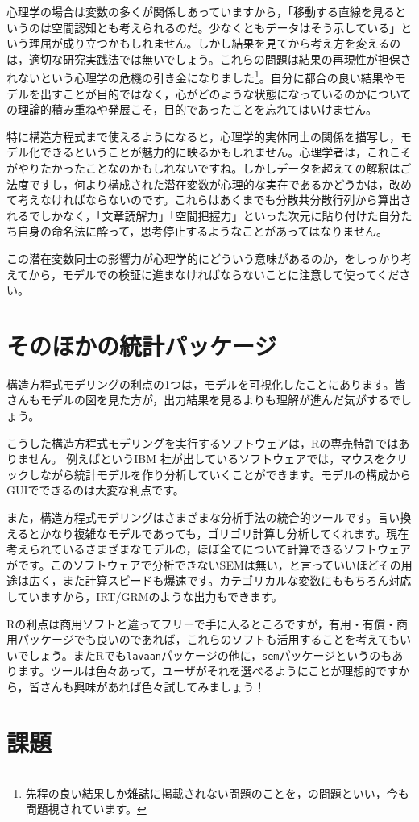 \documentclass{ltjsbook}
\begin{document}
心理学の場合は変数の多くが関係しあっていますから，「移動する直線を見るというのは空間認知とも考えられるのだ。少なくともデータはそう示している」という理屈が成り立つかもしれません。しかし結果を見てから考え方を変えるのは，適切な研究実践法では無いでしょう。これらの問題は結果の再現性が担保されないという心理学の危機の引き金になりました\footnote{先程の良い結果しか雑誌に掲載されない問題のことを，の問題といい，今も問題視されています。}。自分に都合の良い結果やモデルを出すことが目的ではなく，心がどのような状態になっているのかについての理論的積み重ねや発展こそ，目的であったことを忘れてはいけません。

特に構造方程式まで使えるようになると，心理学的実体同士の関係を描写し，モデル化できるということが魅力的に映るかもしれません。心理学者は，これこそがやりたかったことなのかもしれないですね。しかしデータを超えての解釈はご法度ですし，何より構成された潜在変数が心理的な実在であるかどうかは，改めて考えなければならないのです。これらはあくまでも分散共分散行列から算出されるでしかなく，「文章読解力」「空間把握力」といった次元に貼り付けた自分たち自身の命名法に酔って，思考停止するようなことがあってはなりません。

この潜在変数同士の影響力が心理学的にどういう意味があるのか，をしっかり考えてから，モデルでの検証に進まなければならないことに注意して使ってください。

\section{そのほかの統計パッケージ}

構造方程式モデリングの利点の1つは，モデルを可視化したことにあります。皆さんもモデルの図を見た方が，出力結果を見るよりも理解が進んだ気がするでしょう。

こうした構造方程式モデリングを実行するソフトウェアは，Rの専売特許ではありません。
例えばというIBM 社が出しているソフトウェアでは，マウスをクリックしながら統計モデルを作り分析していくことができます。モデルの構成からGUIでできるのは大変な利点です。

また，構造方程式モデリングはさまざまな分析手法の統合的ツールです。言い換えるとかなり複雑なモデルであっても，ゴリゴリ計算し分析してくれます。現在考えられているさまざまなモデルの，ほぼ全てについて計算できるソフトウェアがです。このソフトウェアで分析できないSEMは無い，と言っていいほどその用途は広く，また計算スピードも爆速です。カテゴリカルな変数にももちろん対応していますから，IRT/GRMのような出力もできます。

Rの利点は商用ソフトと違ってフリーで手に入るところですが，有用・有償・商用パッケージでも良いのであれば，これらのソフトも活用することを考えてもいいでしょう。またRでも\texttt{lavaan}パッケージの他に，\texttt{sem}パッケージというのもあります。ツールは色々あって，ユーザがそれを選べるようにことが理想的ですから，皆さんも興味があれば色々試してみましょう！

\section{課題}
\end{document}
